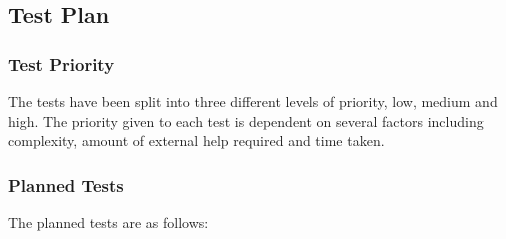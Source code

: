 \pagebreak
\subsection{Test Plan}

\subsubsection{Test Priority}
The tests have been split into three different levels of priority, low, medium and high. The priority given to each test is dependent on several factors including complexity, amount of external help required and time taken.



\subsubsection{Planned Tests}
The planned tests are as follows:

